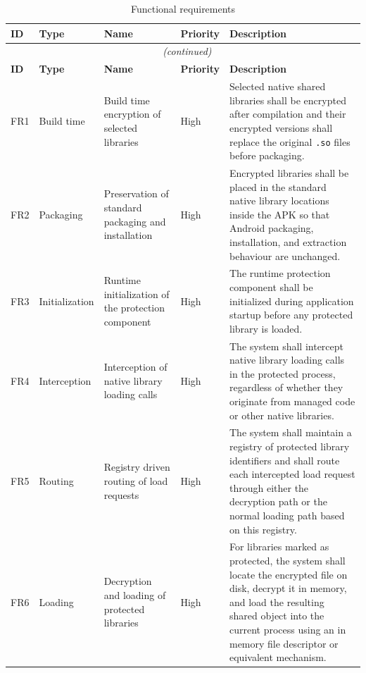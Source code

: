 \documentclass[11pt,a4paper]{report}
\renewcommand\_{{\textunderscore\allowbreak}}
\begin{document}
{%
\begin{longtable}{|p{}|p{}|p{}|p{}|p{}|}
    \caption{Functional requirements} \label{tab:functional_requirements} \\
    \hline
    \textbf{ID} & \textbf{Type} & \textbf{Name} & \textbf{Priority} & \textbf{Description} \\
    \hline
    \endfirsthead
    \multicolumn{5}{c}{\tablename\ \thetable{} \textit{(continued)}} \\[0.5ex]
    \hline
    \textbf{ID} & \textbf{Type} & \textbf{Name} & \textbf{Priority} & \textbf{Description} \\
    \hline
    \endhead
    \endfoot
    \endlastfoot
        FR1 & Build time &
        Build time encryption of selected libraries & High &
        Selected native shared libraries shall be encrypted after compilation and their encrypted versions shall replace the original \texttt{.so} files before packaging. \\
        \hline
        FR2 & Packaging &
        Preservation of standard packaging and installation & High &
        Encrypted libraries shall be placed in the standard native library locations inside the APK so that Android packaging, installation, and extraction behaviour are unchanged. \\
        \hline
        FR3 & Initialization &
        Runtime initialization of the protection component & High &
        The runtime protection component shall be initialized during application startup before any protected library is loaded. \\
        \hline
        FR4 & Interception &
        Interception of native library loading calls & High &
        The system shall intercept native library loading calls in the protected process, regardless of whether they originate from managed code or other native libraries. \\
        \hline
        FR5 & Routing &
        Registry driven routing of load requests & High &
        The system shall maintain a registry of protected library identifiers and shall route each intercepted load request through either the decryption path or the normal loading path based on this registry. \\
        \hline
        FR6 & Loading &
        Decryption and loading of protected libraries & High &
        For libraries marked as protected, the system shall locate the encrypted file on disk, decrypt it in memory, and load the resulting shared object into the current process using an in memory file descriptor or equivalent mechanism. \\

\end{longtable}}
\end{document}
